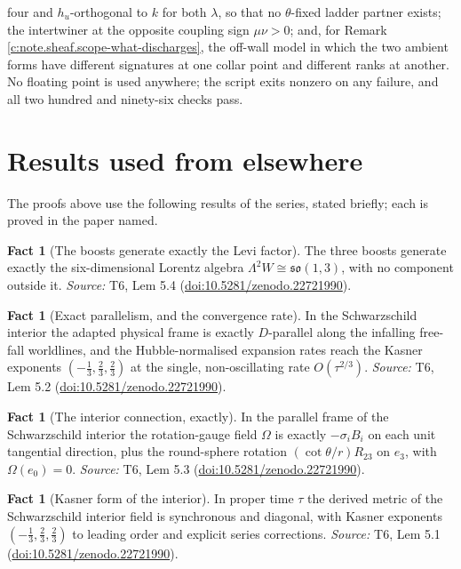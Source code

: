 \documentclass[11pt]{article}
\theoremstyle{definition}
\newtheorem{fact}[theorem]{Fact}
\theoremstyle{plain}
\begin{document}
four and $h_u$-orthogonal to $k$ for both $\lambda$, so that no $\theta$-fixed ladder partner exists; the intertwiner at the opposite coupling sign $\mu\nu > 0$; and, for Remark \ref{c:note.sheaf.scope-what-discharges}, the off-wall model in which the two ambient forms have different signatures at one collar point and different ranks at another. No floating point is used anywhere; the script exits nonzero on any failure, and all two hundred and ninety-six checks pass.

\section{Results used from elsewhere}
The proofs above use the following results of the series, stated briefly; each is proved in the paper named.

\begin{fact}[The boosts generate exactly the Levi factor]\label{c:interior.boosts-generate-exactly-levi-factor}
The three boosts generate exactly the six-dimensional Lorentz algebra $\Lambda^2 W \cong \mathfrak{so}(1,3)$, with no component outside it.
\emph{Source:} T6, Lem 5.4 (\href{https://doi.org/10.5281/zenodo.22721990}{doi:10.5281/zenodo.22721990}).
\end{fact}

\begin{fact}[Exact parallelism, and the convergence rate]\label{c:interior.exact-parallelism-convergence-rate}
In the Schwarzschild interior the adapted physical frame is exactly $D$-parallel along the infalling free-fall worldlines, and the Hubble-normalised expansion rates reach the Kasner exponents $(-\tfrac13, \tfrac23, \tfrac23)$ at the single, non-oscillating rate $O(\tau^{2/3})$.
\emph{Source:} T6, Lem 5.2 (\href{https://doi.org/10.5281/zenodo.22721990}{doi:10.5281/zenodo.22721990}).
\end{fact}

\begin{fact}[The interior connection, exactly]\label{c:interior.interior-connection-exactly}
In the parallel frame of the Schwarzschild interior the rotation-gauge field $\Omega$ is exactly $-\sigma_i B_i$ on each unit tangential direction, plus the round-sphere rotation $(\cot\theta/r)R_{23}$ on $e_3$, with $\Omega(e_0) = 0$.
\emph{Source:} T6, Lem 5.3 (\href{https://doi.org/10.5281/zenodo.22721990}{doi:10.5281/zenodo.22721990}).
\end{fact}

\begin{fact}[Kasner form of the interior]\label{c:interior.kasner-form-interior}
In proper time $\tau$ the derived metric of the Schwarzschild interior field is synchronous and diagonal, with Kasner exponents $(-\tfrac13, \tfrac23, \tfrac23)$ to leading order and explicit series corrections.
\emph{Source:} T6, Lem 5.1 (\href{https://doi.org/10.5281/zenodo.22721990}{doi:10.5281/zenodo.22721990}).
\end{fact}
\end{document}
